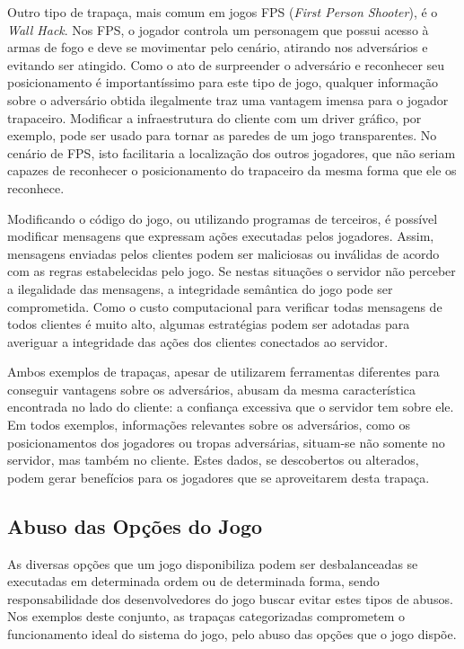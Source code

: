 Outro tipo de trapaça, mais comum em jogos FPS (\textit{First Person Shooter}), é o \textit{Wall Hack}. Nos FPS, o jogador controla um personagem que possui acesso à armas de fogo e deve se movimentar pelo cenário, atirando nos adversários e evitando ser atingido. Como o ato de surpreender o adversário e reconhecer seu posicionamento é importantíssimo para este tipo de jogo, qualquer informação sobre o adversário obtida ilegalmente traz uma vantagem imensa para o jogador trapaceiro. Modificar a infraestrutura do cliente com um driver gráfico, por exemplo, pode ser usado para tornar as paredes de um jogo transparentes. No cenário de FPS, isto facilitaria a localização dos outros jogadores, que não seriam capazes de reconhecer o posicionamento do trapaceiro da mesma forma que ele os reconhece.


Modificando o código do jogo, ou utilizando programas de terceiros, é possível modificar mensagens que expressam ações executadas pelos jogadores. Assim, mensagens enviadas pelos clientes podem ser maliciosas ou inválidas de acordo com as regras estabelecidas pelo jogo. Se nestas situações o servidor não perceber a ilegalidade das mensagens, a integridade semântica do jogo pode ser comprometida. Como o custo computacional para verificar todas mensagens de todos clientes é muito alto, algumas estratégias podem ser adotadas para averiguar a integridade das ações dos clientes conectados ao servidor.

Ambos exemplos de trapaças, apesar de utilizarem ferramentas diferentes para conseguir vantagens sobre os adversários, abusam da mesma característica encontrada no lado do cliente: a confiança excessiva que o servidor tem sobre ele. Em todos exemplos, informações relevantes sobre os adversários, como os posicionamentos dos jogadores ou tropas adversárias, situam-se não somente no servidor, mas também no cliente. Estes dados, se descobertos ou alterados, podem gerar benefícios para os jogadores que se aproveitarem desta trapaça.




\subsection{Abuso das Opções do Jogo}

As diversas opções que um jogo disponibiliza podem ser desbalanceadas se executadas em determinada ordem ou de determinada forma, sendo responsabilidade dos desenvolvedores do jogo buscar evitar estes tipos de abusos. Nos exemplos deste conjunto, as trapaças categorizadas comprometem o funcionamento ideal do sistema do jogo, pelo abuso das opções que o jogo dispõe.

